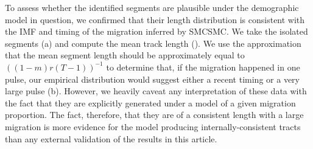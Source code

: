 To assess whether the identified segments are plausible under the demographic model in question, we confirmed that their length distribution is consistent with the IMF and timing of the migration inferred by SMCSMC. We take the isolated segments (a) and compute the mean track length (). We use the approximation that the mean segment length should be approximately equal to $((1-m)r(T-1))^{-1}$ to determine that, if the migration happened in one pulse, our empirical distribution would suggest either a recent timing or a very large pulse (b). However, we heavily caveat any interpretation of these data with the fact that they are explicitly generated under a model of a given migration proportion. The fact, therefore, that they are of a consistent length with a large migration is more evidence for the model producing internally-consistent tracts than any external validation of the results in this article. 


